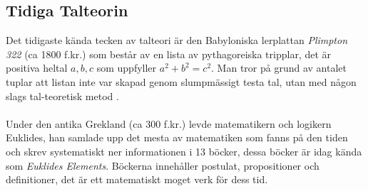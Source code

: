\subsection*{Tidiga Talteorin}
Det tidigaste kända tecken av talteori är den Babyloniska lerplattan \textit{Plimpton 322} (ca 1800 f.kr.) som består av en lista av pythagoreiska tripplar, det är positiva heltal $a,b,c$ som uppfyller $a^2+b^2=c^2$. Man tror på grund av antalet tuplar att listan inte var skapad genom slumpmässigt testa tal, utan med någon slags tal-teoretisk metod \cite{plimpton322:collection}.\\\\
Under den antika Grekland (ca 300 f.kr.) levde matematikern och logikern Euklides, han samlade upp det mesta av matematiken som fanns på den tiden och skrev systematiskt ner informationen i 13 böcker, dessa böcker är idag kända som \textit{Euklides Elements}. Böckerna innehåller postulat, propositioner och definitioner, det är ett matematiskt moget verk för dess tid. \cite{euclid:notgood}
